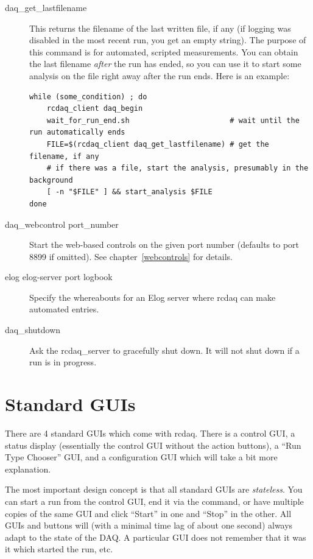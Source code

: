 \documentclass{article}[11pt]
\begin{document}
\begin{description}
\item[daq\_get\_lastfilename] This returns the filename of the last
  written file, if any (if logging was disabled in the most recent
  run, you get an empty string). The purpose of this command is for
  automated, scripted measurements. You can obtain the last filename
  \emph{after} the run has ended, so you can use it to start some
  analysis on the file right away after the run ends. Here is an example:

\begin{verbatim}
while (some_condition) ; do 
    rcdaq_client daq_begin
    wait_for_run_end.sh                       # wait until the run automatically ends 
    FILE=$(rcdaq_client daq_get_lastfilename) # get the filename, if any 
    # if there was a file, start the analysis, presumably in the background
    [ -n "$FILE" ] && start_analysis $FILE
done
\end{verbatim}
  
\item[daq\_webcontrol port\_number ] Start the web-based controls on
  the given port number (defaults to port 8899 if omitted). See
  chapter~\ref{webcontrols} for details.

\item[elog elog-server port logbook] Specify the whereabouts for an
  Elog server where rcdaq can make automated entries. 

\item[daq\_shutdown] Ask the rcdaq\_server to gracefully shut
  down.  It will not shut down if a run is in progress.

\end{description}

\section{Standard GUIs}
\label{GUI}
There are 4 standard GUIs which come with rcdaq. There is a control
GUI, a status display (essentially the control GUI without the action
buttons), a ``Run Type Chooser'' GUI, and a configuration GUI which
will take a bit more explanation. 

The most important design concept is that all standard GUIs are
\emph{stateless}. You can start a run from the control GUI, end it via
the command, or have multiple copies of the same GUI and click
``Start'' in one and ``Stop'' in the other. All GUIs and buttons will
(with a minimal time lag of about one second) always adapt to the
state of the DAQ. A particular GUI does not remember that it was it
which started the run, etc. 
\end{document}

